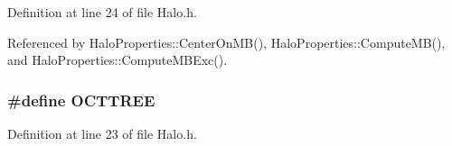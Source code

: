 Definition at line 24 of file Halo.h.



Referenced by HaloProperties::CenterOnMB(), HaloProperties::ComputeMB(), and HaloProperties::ComputeMBExc().

\subsubsection[{OCTTREE}]{\setlength{\rightskip}{0pt plus 5cm}\#define OCTTREE}\label{Halo_8h_a690ba77d26036cf5527579144de3086b}


Definition at line 23 of file Halo.h.

